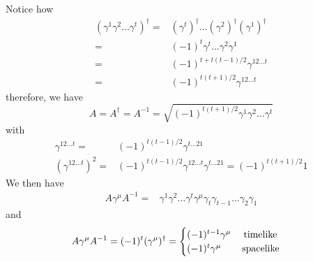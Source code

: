 \begin{rmk}
Notice how
\begin{align*}
(\gamma ^{1}\gamma ^{2}\ldots \gamma ^{t})^{\dagger}=&(\gamma ^{t})^{\dagger}\ldots (\gamma ^{2})^{\dagger}(\gamma ^{1})^{\dagger}\\
=&(-1)^{t}\gamma ^{t}\ldots \gamma ^{2}\gamma ^{1}\\
=&(-1)^{t+t(t-1)/2}\gamma ^{12\ldots t}\\
=&(-1)^{t(t+1)/2}\gamma ^{12\ldots t}
\end{align*}
therefore, we have
\[A=A^{\dagger}=A^{-1}=\sqrt{(-1)^{t(t+1)/2}\gamma ^{1}\gamma ^{2}\ldots \gamma ^{t}}\]
with
\begin{align*}
\gamma ^{12\ldots t}=&(-1)^{t(t-1)/2}\gamma^{t\ldots 21}\\
(\gamma ^{12\ldots t})^2=&(-1)^{t(t-1)/2}\gamma ^{12\ldots t}\gamma ^{t\ldots 21}=(-1)^{t(t+1)/2}1
\end{align*}
We then have
\begin{align*}
A\gamma ^{\mu }A^{-1}=&\gamma ^{1}\gamma^{2}\ldots \gamma ^{t}\gamma ^{\mu }\gamma _{t}\gamma_{t-1}\ldots \gamma _{2}\gamma _{1}
\end{align*}
and
\[A\gamma ^{\mu }A^{-1}=(-1)^{t}(\gamma ^{\mu })^{\dagger}=\begin{cases}
(-1)^{t-1}\gamma ^{\mu }\hspace{3ex}\mathrm{timelike}\\
(-1)^{t}\gamma ^{\mu }\hspace{5ex}\mathrm{spacelike}
\end{cases}\]
\end{rmk}
\vspace{2ex}

